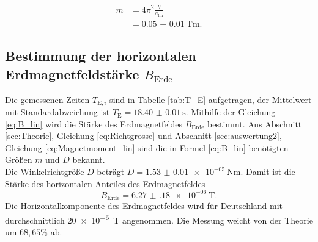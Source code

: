 \begin{align}
	m 	&= 4\pi^2\frac{\theta}{a_\text{lin}}\\
		&= \SI{0.05(1)}{\tesla\meter}.
	\label{eq:Magnetmoment_lin}
\end{align}
\subsection{Bestimmung der horizontalen \texorpdfstring{Erdmagnetfeldstärke $B_\text{Erde}$}{Magnetfeldstärke B der Erde}}
\label{sec:auswertung3}

Die gemessenen Zeiten $T_{\text{E},i}$ sind in Tabelle \ref{tab:T_E} aufgetragen, der Mittelwert mit Standardabweichung ist
$T_\text{E}=\SI{18.40(1)}{\second}$.
Mithilfe der Gleichung \eqref{eq:B_lin} wird die Stärke des Erdmagnetfeldes $B_\text{Erde}$ bestimmt.
Aus Abschnitt \ref{sec:Theorie}, Gleichung \eqref{eq:Richtgrosse} und Abschnitt \ref{sec:auswertung2}, Gleichung \eqref{eq:Magnetmoment_lin} sind die in Formel \eqref{eq:B_lin} benötigten Größen $m$ und $D$ bekannt.\\
Die Winkelrichtgröße $D$ beträgt
$D = \SI{1.53(1)e-05}{\newton\meter}$.
Damit ist die Stärke des horizontalen Anteiles des Erdmagnetfeldes
\begin{equation}
	B_\text{Erde}=\SI{6.27(18)e-06}{\tesla}.
\end{equation}
Die Horizontalkomponente des Erdmagnetfeldes wird für Deutschland mit durchschnittlich \SI{20e-6}{\tesla} \cite{lausitz} angenommen.
Die Messung weicht von der Theorie um $68,65\%$ ab.

